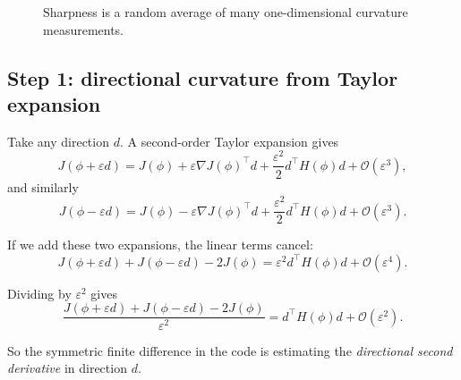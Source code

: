 \documentclass[11pt,letterpaper]{article}
\begin{document}
\begin{figure}[htbp]
\centering
{}
\caption{Sharpness is a random average of many one-dimensional curvature measurements.}
\end{figure}

\subsection{Step 1: directional curvature from Taylor expansion}

Take any direction $d$. A second-order Taylor expansion gives
\[
J(\phi+\varepsilon d)
=
J(\phi)
+
\varepsilon \nabla J(\phi)^\top d
+
\frac{\varepsilon^2}{2} d^\top H(\phi) d
+
\mathcal{O}(\varepsilon^3),
\]
and similarly
\[
J(\phi-\varepsilon d)
=
J(\phi)
-
\varepsilon \nabla J(\phi)^\top d
+
\frac{\varepsilon^2}{2} d^\top H(\phi) d
+
\mathcal{O}(\varepsilon^3).
\]

If we add these two expansions, the linear terms cancel:
\[
J(\phi+\varepsilon d)+J(\phi-\varepsilon d)-2J(\phi)
=
\varepsilon^2 d^\top H(\phi)d + \mathcal{O}(\varepsilon^4).
\]

Dividing by $\varepsilon^2$ gives
\[
\frac{J(\phi+\varepsilon d)+J(\phi-\varepsilon d)-2J(\phi)}{\varepsilon^2}
=
d^\top H(\phi)d + \mathcal{O}(\varepsilon^2).
\]

So the symmetric finite difference in the code is estimating the
\emph{directional second derivative} in direction $d$.
\end{document}

